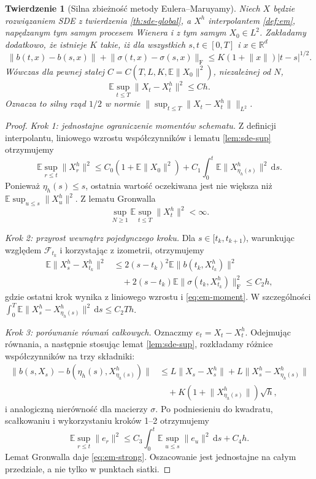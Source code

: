 \documentclass[11pt,a4paper,oneside]{report}
\numberwithin{equation}{chapter}
\theoremstyle{plain}
\newtheorem{twierdzenie}{Twierdzenie}[chapter]
\theoremstyle{definition}
\theoremstyle{remark}
\newcommand{\R}{\mathbb{R}}
\newcommand{\E}{\mathbb{E}}
\newcommand{\calF}{\mathcal{F}}
\newcommand{\dd}{\mathrm{d}}
\newcommand{\norm}[1]{\lVert #1\rVert}
\begin{document}
\begin{twierdzenie}[Silna zbieżność metody Eulera--Maruyamy]
\label{th:em-rate}
Niech $X$ będzie rozwiązaniem SDE z twierdzenia
\ref{th:sde-global}, a $X^h$ interpolantem
\ref{def:em}, napędzanym tym samym procesem Wienera
i z tym samym $X_0\in L^2$. Zakładamy dodatkowo,
że istnieje $K$ takie, iż dla wszystkich $s,t\in[0,T]$
i $x\in\R^d$
\[
\norm{b(t,x)-b(s,x)}+
\norm{\sigma(t,x)-\sigma(s,x)}_{\mathrm F}
\le K(1+\norm{x})|t-s|^{1/2}.
\tag{6.12}\label{eq:time-holder}
\]
Wówczas dla pewnej stałej $C=C(T,L,K,\E\norm{X_0}^2)$,
niezależnej od $N$,
\[
\E\sup_{t\le T}\norm{X_t-X_t^h}^2\le Ch.
\tag{6.13}\label{eq:em-strong}
\]
Oznacza to silny rząd $1/2$ w normie
$\|\sup_{t\le T}\norm{X_t-X_t^h}\|_{L^2}$.
\end{twierdzenie}
\begin{proof}
\emph{Krok 1: jednostajne ograniczenie momentów schematu.}
Z definicji interpolantu, liniowego wzrostu
współczynników i lematu \ref{lem:sde-sup} otrzymujemy
\[
\E\sup_{r\le t}\norm{X_r^h}^2
\le C_0(1+\E\norm{X_0}^2)
+C_1\int_0^t\E\norm{X^h_{\eta_h(s)}}^2\,\dd s.
\]
Ponieważ $\eta_h(s)\le s$, ostatnia wartość
oczekiwana jest nie większa niż
$\E\sup_{u\le s}\norm{X_u^h}^2$.
Z lematu Gronwalla
\[
\sup_{N\ge1}\E\sup_{t\le T}\norm{X_t^h}^2<\infty.
\tag{6.14}\label{eq:em-moment}
\]

\emph{Krok 2: przyrost wewnątrz pojedynczego kroku.}
Dla $s\in[t_k,t_{k+1})$, warunkując względem
$\calF_{t_k}$ i korzystając z izometrii,
otrzymujemy
\[
\begin{split}
\E\norm{X_s^h-X_{t_k}^h}^2
&\le2(s-t_k)^2\E\norm{b(t_k,X_{t_k}^h)}^2\\
&\quad+2(s-t_k)\E\norm{\sigma(t_k,X_{t_k}^h)}_{\mathrm F}^2
\le C_2h,
\end{split}
\]
gdzie ostatni krok wynika z liniowego wzrostu i
\eqref{eq:em-moment}. W szczególności
$\int_0^T\E\norm{X_s^h-X_{\eta_h(s)}^h}^2\,\dd s
\le C_2Th$.

\emph{Krok 3: porównanie równań całkowych.}
Oznaczmy $e_t=X_t-X_t^h$. Odejmując równania,
a następnie stosując lemat \ref{lem:sde-sup},
rozkładamy różnice współczynników na trzy składniki:
\[
\begin{split}
\norm{b(s,X_s)-b(\eta_h(s),X^h_{\eta_h(s)})}
&\le L\norm{X_s-X_s^h}
+L\norm{X_s^h-X^h_{\eta_h(s)}}\\
&\quad+K(1+\norm{X^h_{\eta_h(s)}})\sqrt h,
\end{split}
\]
i analogiczną nierówność dla macierzy $\sigma$.
Po podniesieniu do kwadratu, scałkowaniu i
wykorzystaniu kroków 1--2 otrzymujemy
\[
\E\sup_{r\le t}\norm{e_r}^2
\le C_3\int_0^t\E\sup_{u\le s}\norm{e_u}^2\,\dd s
+C_4h.
\]
Lemat Gronwalla daje \eqref{eq:em-strong}.
Oszacowanie jest jednostajne na całym przedziale,
a nie tylko w punktach siatki.
\end{proof}
\end{document}
